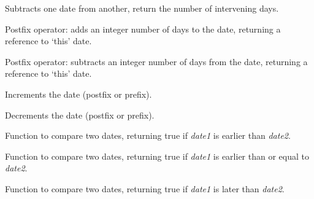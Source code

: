 
Subtracts one date from another, return the number of intervening days.

\label{wxdateplusequals}


Postfix operator: adds an integer number of days to the date, returning
a reference to `this' date.

\label{wxdateminusequals}


Postfix operator: subtracts an integer number of days from the date, returning
a reference to `this' date.

\label{wxdateplusplus}


Increments the date (postfix or prefix).

\label{wxdateminusminus}


Decrements the date (postfix or prefix).

\label{wxdatelessthan}


Function to compare two dates, returning true if {\it date1} is earlier than {\it date2}.

\label{wxdatelessthaneq}


Function to compare two dates, returning true if {\it date1} is earlier than or equal to {\it date2}.

\label{wxdategreaterthan}


Function to compare two dates, returning true if {\it date1} is later than {\it date2}.

\label{wxdategreaterthaneq}

